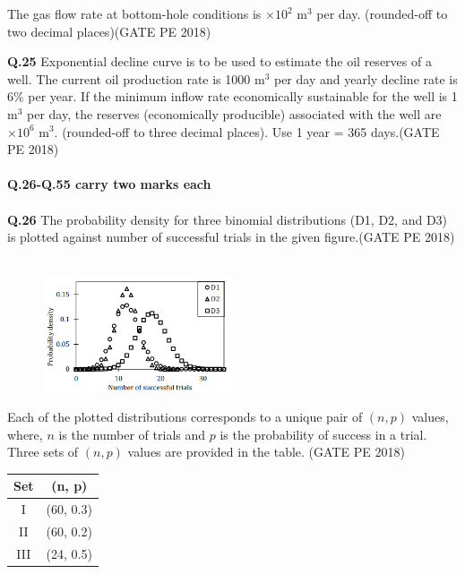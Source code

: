 \documentclass[12pt,a4paper]{article}
\begin{document}
\vspace{0.2cm}
The gas flow rate at bottom-hole conditions is \underline{\hspace{1.5cm}} $\times 10^2$ m$^3$ per day. (rounded-off to two decimal places)\hfill(GATE PE 2018)

\pagebreak

\noindent\textbf{Q.25} Exponential decline curve is to be used to estimate the oil reserves of a well. The current oil production rate is 1000 m$^3$ per day and yearly decline rate is 6\% per year. If the minimum inflow rate economically sustainable for the well is 1 m$^3$ per day, the reserves (economically producible) associated with the well are \underline{\hspace{2cm}} $\times 10^6$ m$^3$. (rounded-off to three decimal places). Use 1 year = 365 days.\hfill(GATE PE 2018)\\\\

\noindent
{\large \textbf{Q.26-Q.55 carry two marks each}}\\\\

\noindent
\textbf{Q.26} The probability density for three binomial distributions (D1, D2, and D3) is plotted against
number of successful trials in the given figure.\hfill(GATE PE 2018)\\\\


\begin{figure}[h!]
  \centering
  \includegraphics[width=0.5\textwidth]{pic8.png} 
\end{figure}

Each of the plotted distributions corresponds to a unique pair of $(n, p)$ values, where, $n$ is the number of trials and $p$ is the probability of success in a trial. Three sets of $(n, p)$ values are provided in the table.
\hfill (GATE PE 2018)

\begin{center}
\begin{tabular}{|c|c|}
\hline
Set & (n, p) \\
\hline
I & (60, 0.3) \\
II & (60, 0.2) \\
III & (24, 0.5) \\
\hline
\end{tabular}
\end{center}
\end{document}
